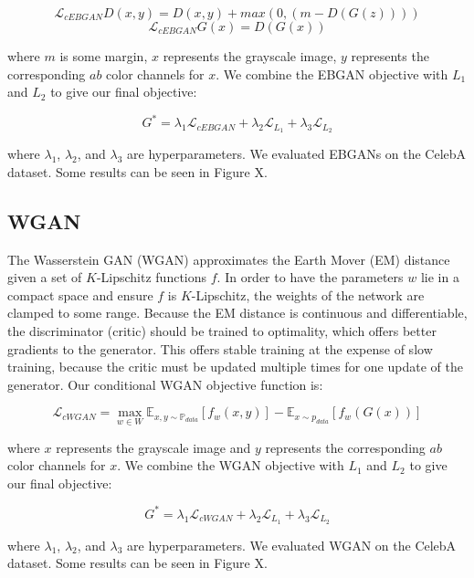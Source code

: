 \documentclass[10pt]{article}
\begin{document}
\[\mathcal{L}_{cEBGAN} D(x,y) = D(x,y) + max(0, (m-D(G(z)))) \]
\[\mathcal{L}_{cEBGAN} G(x) = D(G(x)) \]


\noindent where $m$ is some margin, $x$ represents the grayscale image, $y$ represents the corresponding
$ab$ color channels for $x$. We combine the EBGAN objective with $L_1$ and $L_2$ to give our final objective:

\[ G^* = \lambda_1 \mathcal{L}_{cEBGAN} + \lambda_2 \mathcal{L}_{L_1} + \lambda_3 \mathcal{L}_{L_2} \]

\noindent where $\lambda_1$, $\lambda_2$, and $\lambda_3$ are hyperparameters. We evaluated EBGANs on
the CelebA dataset. Some results can be seen in Figure X. 

\subsection{WGAN}
The Wasserstein GAN (WGAN) approximates the Earth Mover (EM) distance given a set of $K$-Lipschitz functions 
$f$. In order to have the parameters $w$ lie in a compact space and ensure $f$ is $K$-Lipschitz, the weights
of the network are clamped to some range. Because the EM distance is continuous and differentiable, the
discriminator (critic) should be trained to optimality, which offers better gradients to the generator. This 
offers stable training at the expense of slow training, because the critic must be updated multiple times
for one update of the generator. Our conditional WGAN objective function is:

\[\mathcal{L}_{cWGAN} = \max\limits_{w \in W} \mathbb{E}_{x,y \sim \mathbb{P}_{data}}[f_w(x,y)] -
\mathbb{E}_{x \sim p_{data}}[f_w(G(x))]\]

\noindent where $x$ represents the grayscale image and $y$ represents the corresponding
$ab$ color channels for $x$. We combine the WGAN objective with $L_1$ and $L_2$ to give our final objective:


\[ G^* = \lambda_1 \mathcal{L}_{cWGAN} + \lambda_2 \mathcal{L}_{L_1} + \lambda_3 \mathcal{L}_{L_2} \]

\noindent where $\lambda_1$, $\lambda_2$, and $\lambda_3$ are hyperparameters. We evaluated WGAN on
the CelebA dataset. Some results can be seen in Figure X. 

\end{document}

